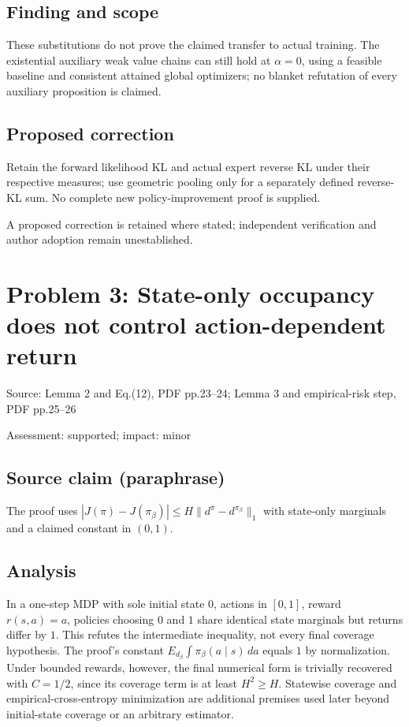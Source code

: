 \documentclass[11pt]{article}
\begin{document}
\subsection*{Finding and scope}

These substitutions do not prove the claimed transfer to actual training. The existential auxiliary weak value chains can still hold at \(\alpha=0\), using a feasible baseline and consistent attained global optimizers; no blanket refutation of every auxiliary proposition is claimed.

\subsection*{Proposed correction}

Retain the forward likelihood KL and actual expert reverse KL under their respective measures; use geometric pooling only for a separately defined reverse-KL sum. No complete new policy-improvement proof is supplied.

A proposed correction is retained where stated; independent verification and author adoption remain unestablished.

\section*{Problem 3: State-only occupancy does not control action-dependent return}

Source: Lemma 2 and Eq.(12), PDF pp.23–24; Lemma 3 and empirical-risk step, PDF pp.25–26

Assessment: supported; impact: minor

\subsection*{Source claim (paraphrase)}

The proof uses \(|J(\pi)-J(\pi_\beta)|\le H\|d^\pi-d^{\pi_\beta}\|_1\) with state-only marginals and a claimed constant in \((0,1)\).

\subsection*{Analysis}

In a one-step MDP with sole initial state \(0\), actions in \([0,1]\), reward \(r(s,a)=a\), policies choosing \(0\) and \(1\) share identical state marginals but returns differ by \(1\). This refutes the intermediate inequality, not every final coverage hypothesis. The proof’s constant \(E_{d_\beta}\int\pi_\beta(a\mid s)\,da\) equals \(1\) by normalization. Under bounded rewards, however, the final numerical form is trivially recovered with \(C=1/2\), since its coverage term is at least \(H^2\ge H\). Statewise coverage and empirical-cross-entropy minimization are additional premises used later beyond initial-state coverage or an arbitrary estimator.
\end{document}
